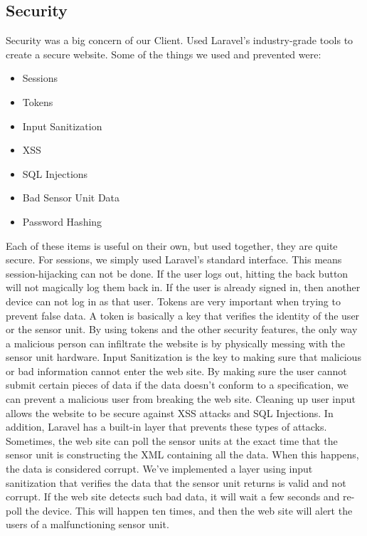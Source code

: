 \documentclass{report}
\begin{document}
\subsection*{Security}
\indent
\indent
Security was a big concern of our Client. Used Laravel's industry-grade tools to create a secure website. Some of the things we used and prevented were:
\begin{itemize}
	\item Sessions
	\item Tokens
	\item Input Sanitization
	\item XSS
	\item SQL Injections
	\item Bad Sensor Unit Data
	\item Password Hashing
\end{itemize}
\indent
Each of these items is useful on their own, but used together, they are quite secure.
\newline
\indent
For sessions, we simply used Laravel's standard interface. This means session-hijacking can not be done. If the user logs out, hitting the back button will not magically log them back in. If the user is already signed in, then another device can not log in as that user.
\newline
\indent
Tokens are very important when trying to prevent false data. A token is basically a key that verifies the identity of the user or the sensor unit. By using tokens and the other security features, the only way a malicious person can infiltrate the website is by physically messing with the sensor unit hardware.
\newline
\indent
Input Sanitization is the key to making sure that malicious or bad information cannot enter the web site. By making sure the user cannot submit certain pieces of data if the data doesn't conform to a specification, we can prevent a malicious user from breaking the web site. Cleaning up user input allows the website to be secure against XSS attacks and SQL Injections. In addition, Laravel has a built-in layer that prevents these types of attacks.
\newline
\indent
Sometimes, the web site can poll the sensor units at the exact time that the sensor unit is constructing the XML containing all the data. When this happens, the data is considered corrupt. We've implemented a layer using input sanitization that verifies the data that the sensor unit returns is valid and not corrupt. If the web site detects such bad data, it will wait a few seconds and re-poll the device. This will happen ten times, and then the web site will alert the users of a malfunctioning sensor unit.
\end{document}
